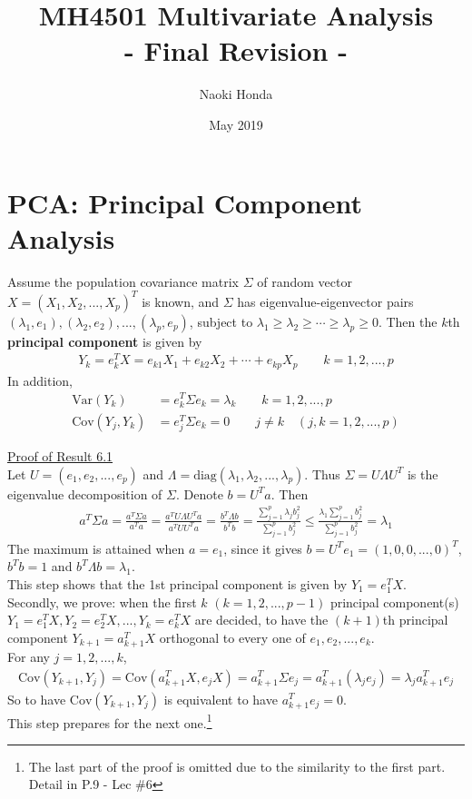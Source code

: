 \documentclass[12pt]{extarticle}
\title{\textbf{MH4501 Multivariate Analysis}\\
\Large - Final Revision -}
\author{Naoki Honda}
\date{May 2019}
\newcommand{\<}{\langle}
\renewcommand{\>}{\rangle}
\theoremstyle{definition}
\begin{document}
\maketitle
\section{PCA: Principal Component Analysis}
\begin{tcolorbox}[enhanced, drop fuzzy shadow, title=Population PCA (Result 6.1)]
Assume the population covariance matrix $\Sigma$ of random vector $X=(X_1,X_2,...,X_p)^T$ is known, and $\Sigma$ has eigenvalue-eigenvector pairs $(\lambda_1,e_1),(\lambda_2,e_2),...,(\lambda_p,e_p)$, subject to $\lambda_1 \geq \lambda_2 \geq \cdots \geq \lambda_p \geq 0$. Then the $k$th \textbf{principal component} is given by
\begin{align*}
    Y_k = e_k^T X = e_{k1}X_1 +e_{k2}X_2 +\cdots +e_{kp}X_p \qquad k=1,2,...,p
\end{align*}
In addition,
\begin{align*}
    \text{Var}(Y_k) &=e_k^T \Sigma e_k =\lambda_k \qquad k=1,2,...,p \\
    \text{Cov}(Y_j, Y_k) &= e_j^T \Sigma e_k =0 \qquad j \neq k \quad (j,k=1,2,...,p)
\end{align*}
\end{tcolorbox}

\underline{Proof of Result 6.1}\\
Let $U=(e_1,e_2,...,e_p)$ and $\Lambda=\text{diag}(\lambda_1,\lambda_2,...,\lambda_p)$. Thus $\Sigma =U\Lambda U^T$ is the eigenvalue decomposition of $\Sigma$. Denote $b=U^T a$. Then
\begin{align*}
    a^T \Sigma a=\frac{a^T \Sigma a}{a^T a} = \frac{a^T U\Lambda U^T a}{a^T UU^T a}= \frac{b^T \Lambda b}{b^T b} = \frac{\sum^p_{j=1}\lambda_j b^2_j}{\sum^p_{j=1} b^2_j} \leq \frac{\lambda_1 \sum^p_{j=1}b^2_j}{\sum^p_{j=1} b^2_j} = \lambda_1
\end{align*}
The maximum is attained when $a=e_1$, since it gives $b=U^T e_1 = (1,0,0,...,0)^T$, $b^T b =1$ and $b^T \Lambda b =\lambda_1$.\\
This step shows that the 1st principal component is given by $Y_1 =e_1^T X$.\\

Secondly, we prove: when the first $k$ $(k=1,2,...,p-1)$ principal component(s) $Y_1 =e_1^T X, Y_2 =e_2^T X, ..., Y_k =e_k^T X$ are decided, to have the $(k+1)$th principal component $Y_{k+1}=a^T_{k+1} X$ orthogonal to every one of $e_1,e_2,...,e_k$.\\
For any $j=1,2,...,k$,
\begin{align*}
    \text{Cov}(Y_{k+1},Y_j) = \text{Cov}(a^T_{k+1}X,e_j X) = a^T_{k+1}\Sigma e_j = a^T_{k+1}(\lambda_j e_j) = \lambda_j a^T_{k+1}e_j
\end{align*}
So to have $\text{Cov}(Y_{k+1},Y_j)$ is equivalent to have $a^T_{k+1}e_j =0$.\\
This step prepares for the next one.\footnote{The last part of the proof is omitted due to the similarity to the first part. Detail in P.9 - Lec \#6}\\
\end{document}
